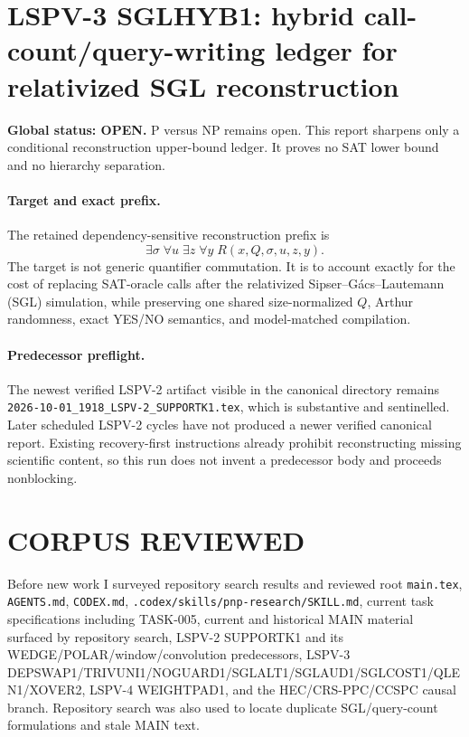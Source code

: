 \documentclass[11pt]{article}
\begin{document}
\section*{LSPV-3 SGLHYB1: hybrid call-count/query-writing ledger for relativized SGL reconstruction}

\textbf{Global status: OPEN.} P versus NP remains open. This report sharpens only a conditional reconstruction upper-bound ledger. It proves no SAT lower bound and no hierarchy separation.

\paragraph{Target and exact prefix.}
The retained dependency-sensitive reconstruction prefix is
\[
\boxed{\exists\sigma\;\forall u\;\exists z\;\forall y\;R(x,Q,\sigma,u,z,y).}
\]
The target is not generic quantifier commutation. It is to account exactly for the cost of replacing SAT-oracle calls after the relativized Sipser--G\'acs--Lautemann (SGL) simulation, while preserving one shared size-normalized $Q$, Arthur randomness, exact YES/NO semantics, and model-matched compilation.

\paragraph{Predecessor preflight.}
The newest verified LSPV-2 artifact visible in the canonical directory remains
\texttt{2026-10-01\_1918\_LSPV-2\_SUPPORTK1.tex}, which is substantive and sentinelled. Later scheduled LSPV-2 cycles have not produced a newer verified canonical report. Existing recovery-first instructions already prohibit reconstructing missing scientific content, so this run does not invent a predecessor body and proceeds nonblocking.

\section*{CORPUS REVIEWED}
Before new work I surveyed repository search results and reviewed root \texttt{main.tex}, \texttt{AGENTS.md}, \texttt{CODEX.md}, \texttt{.codex/skills/pnp-research/SKILL.md}, current task specifications including TASK-005, current and historical MAIN material surfaced by repository search, LSPV-2 SUPPORTK1 and its WEDGE/POLAR/window/convolution predecessors, LSPV-3 DEPSWAP1/TRIVUNI1/NOGUARD1/SGLALT1/SGLAUD1/SGLCOST1/QLEN1/XOVER2, LSPV-4 WEIGHTPAD1, and the HEC/CRS-PPC/CCSPC causal branch. Repository search was also used to locate duplicate SGL/query-count formulations and stale MAIN text.
\end{document}
